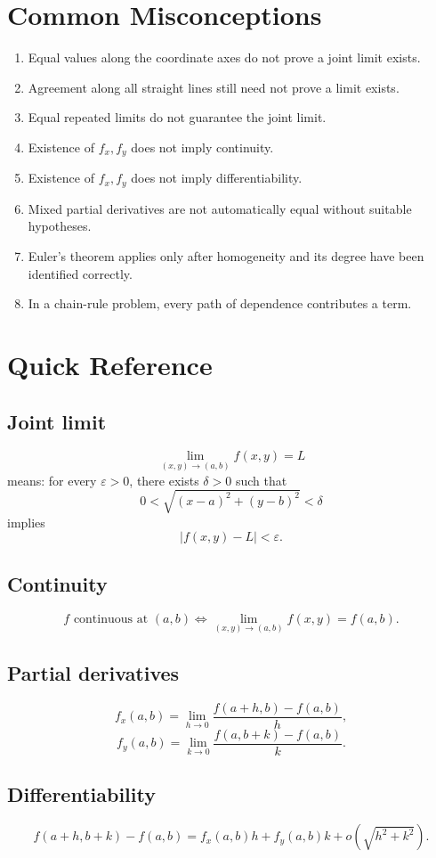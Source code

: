 \documentclass[11pt,oneside]{book}
\theoremstyle{studentthm}
\theoremstyle{definition}
\newcommand{\eps}{\varepsilon}
\newcommand{\abs}[1]{\left|#1\right|}
\begin{document}
\section{Common Misconceptions}

\begin{enumerate}
\item Equal values along the coordinate axes do not prove a joint
limit exists.
\item Agreement along all straight lines still need not prove a limit
exists.
\item Equal repeated limits do not guarantee the joint limit.
\item Existence of \(f_x,f_y\) does not imply continuity.
\item Existence of \(f_x,f_y\) does not imply differentiability.
\item Mixed partial derivatives are not automatically equal without
suitable hypotheses.
\item Euler's theorem applies only after homogeneity and its degree
have been identified correctly.
\item In a chain-rule problem, every path of dependence contributes a
term.
\end{enumerate}

\section{Quick Reference}

\subsection*{Joint limit}
\[
\lim_{(x,y)\to(a,b)}f(x,y)=L
\]
means: for every \(\eps>0\), there exists \(\delta>0\) such that
\[
0<\sqrt{(x-a)^2+(y-b)^2}<\delta
\]
implies
\[
\abs{f(x,y)-L}<\eps.
\]

\subsection*{Continuity}
\[
f\text{ continuous at }(a,b)
\iff
\lim_{(x,y)\to(a,b)}f(x,y)=f(a,b).
\]

\subsection*{Partial derivatives}
\[
f_x(a,b)
=
\lim_{h\to0}
\frac{f(a+h,b)-f(a,b)}{h},
\]
\[
f_y(a,b)
=
\lim_{k\to0}
\frac{f(a,b+k)-f(a,b)}{k}.
\]

\subsection*{Differentiability}
\[
f(a+h,b+k)-f(a,b)
=
f_x(a,b)h+f_y(a,b)k
+
o(\sqrt{h^2+k^2}).
\]
\end{document}

